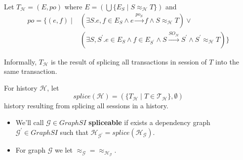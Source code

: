\documentclass{beamer}
\begin{document}
\begin{frame}
	\begin{definition}
		Let $\boxed{T}_\mathcal{H} = (E, po)$ where 
		$ E = \left(\bigcup \{E_S \mid S \approx_\mathcal{H} T \} \right) $
		and
		$$
		\begin{aligned}
			po = \{ (e,f) \mid & \left( \exists S . e,f \in E_S \wedge e \xrightarrow{po_S} f \wedge S \approx_\mathcal{H} T \right) \vee \\ 
			                   & \left( \exists S, S^\prime . e\in E_S \wedge f \in E_{S^\prime} \wedge S \xrightarrow{SO_\mathcal{H}} S^\prime \wedge S^\prime \approx_\mathcal{H} T \right) \}
		\end{aligned}
		$$	
	\end{definition}
	Informally, $\boxed{T}_\mathcal{H}$ is the result of splicing all transactions in session of $T$ into the same transaction.
\end{frame}

\begin{frame}
	\begin{definition}
		For history $\mathcal{H}$, let 
		$$ splice(\mathcal{H})=\left( \{ \boxed{T}_\mathcal{H} \mid T \in \mathcal{T}_\mathcal{H} \}, \emptyset \right) $$
		history resulting from splicing all sessions in a history.
	\end{definition}
	\begin{itemize}
		\item We'll call $\mathcal{G} \in GraphSI $ \textbf{spliceable} if exists a dependency graph $ \mathcal{G}^\prime \in GraphSI $ such that $ \mathcal{H}_{\mathcal{G}^\prime} = splice(\mathcal{H}_\mathcal{G})$.
		\item For graph $\mathcal{G}$ we let $\approx_\mathcal{G} = \approx_{\mathcal{H}_\mathcal{G}}$.
	\end{itemize}
\end{frame}
\end{document}
